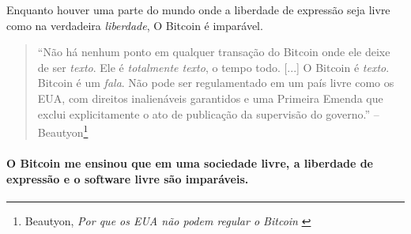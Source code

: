 Enquanto houver uma parte do mundo onde a liberdade de expressão seja livre como na verdadeira \textit{liberdade}, O Bitcoin é imparável.

\begin{quotation}\begin{samepage}
\begin{flushright}
\enquote{Não há nenhum ponto em qualquer transação do Bitcoin onde ele deixe de ser \textit{texto}. Ele é \textit{totalmente texto}, o tempo todo. [...] O Bitcoin é \textit{texto}. Bitcoin é um \textit{fala}. Não pode ser regulamentado em um país livre como os EUA, com direitos inalienáveis garantidos e uma Primeira Emenda que exclui explicitamente o ato de publicação da supervisão do governo.}
-- Beautyon\footnote{Beautyon, \textit{Por que os EUA não podem regular o Bitcoin} \cite{america-regulate-bitcoin}}
\end{flushright}\end{samepage}\end{quotation}

\paragraph{O Bitcoin me ensinou que em uma sociedade livre, a liberdade de expressão e o software livre são imparáveis.}

%
%
%
%
%
%
%
